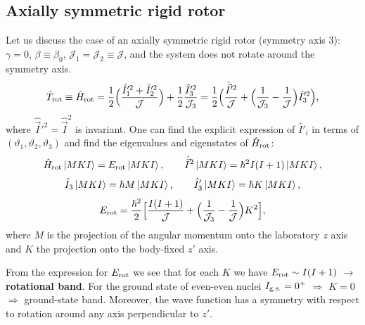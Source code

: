 \documentclass[11pt,a4paper]{article}
\newcommand{\op}[1]{\hat{#1}}
\begin{document}
\subsection{Axially symmetric rigid rotor}
Let us discuss the case of an axially symmetric rigid rotor (symmetry axis 3): $\gamma=0$, $\beta\equiv\beta_0$, $\mathcal J_1=\mathcal J_2\equiv\mathcal J$, and the system does not rotate around the symmetry axis.
\[
\op T_{\rm rot}\equiv\op H_{\rm rot}=\frac12\Big(\frac{\op I'^2_1+\op I'^2_2}{\mathcal J}\Big)+\frac12\frac{\op I'^2_3}{\mathcal J_3}
=\frac12\Big(\frac{\op{\vec I}'^2}{\mathcal J}+\Big(\frac{1}{\mathcal J_3}-\frac1{\mathcal J}\Big)\op I'^2_3\Big),
\]
where $\op{\vec I}'^2=\op{\vec I}^2$ is invariant.
One can find the explicit expression of $\op I'_i$ in terms of $(\vartheta_1,\vartheta_2,\vartheta_3)$ and find the eigenvalues and eigenstates of $\op H_{\rm rot}$:
\[
\op H_{\rm rot}\ket{MKI}=E_{\rm rot}\ket{MKI},\qquad
\op{\vec I}^2\ket{MKI}=\hbar^2I(I+1)\ket{MKI},
\]
\[
\op I_3\ket{MKI}=\hbar M\ket{MKI},\qquad
\op I'_3\ket{MKI}=\hbar K\ket{MKI},
\]
\[
E_{\rm rot}=\frac{\hbar^2}{2}\Big[\frac{I(I+1)}{\mathcal J}+\Big(\frac{1}{\mathcal J_3}-\frac1{\mathcal J}\Big)K^2\Big],
\]
where $M$ is the projection of the angular momentum onto the laboratory $z$ axis and $K$ the projection onto the body-fixed $z'$ axis.
\begin{center}
\end{center}
From the expression for $E_{\rm rot}$ we see that for each $K$ we have $E_{\rm rot}\sim I(I+1)$ $\to$ \textbf{rotational band}.
For the ground state of even-even nuclei $I_{\rm g.s.}=0^+$ $\Rightarrow$ $K=0$ $\Rightarrow$ ground-state band.
Moreover, the wave function has a symmetry with respect to rotation around any axis perpendicular to $z'$.
\begin{center}
\end{center}
\end{document}
